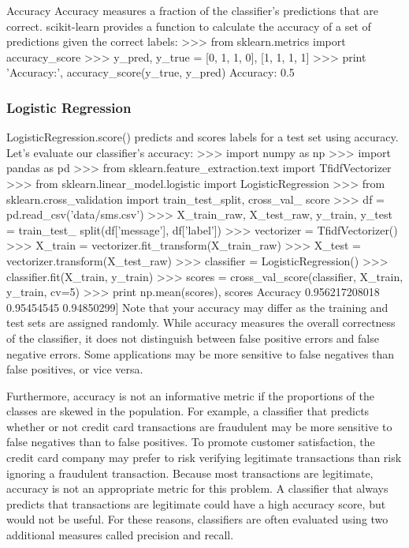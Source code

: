 \begin{frame}
\begin{frame}
\begin{frame}
\begin{frame}
\begin{frame}
Accuracy
Accuracy measures a fraction of the classifier's predictions that are correct.
scikit-learn provides a function to calculate the accuracy of a set of predictions
given the correct labels:
>>> from sklearn.metrics import accuracy_score
>>> y_pred, y_true = [0, 1, 1, 0], [1, 1, 1, 1]
>>> print 'Accuracy:', accuracy_score(y_true, y_pred)
Accuracy: 0.5
\begin{frame}\frametitle{Logistic Regression}
LogisticRegression.score() predicts and scores labels for a test set using
accuracy. Let's evaluate our classifier's accuracy:
>>> import numpy as np
>>> import pandas as pd
>>> from sklearn.feature_extraction.text import TfidfVectorizer
>>> from sklearn.linear_model.logistic import LogisticRegression
>>> from sklearn.cross_validation import train_test_split, cross_val_
score
>>> df = pd.read_csv('data/sms.csv')
>>> X_train_raw, X_test_raw, y_train, y_test = train_test_
split(df['message'], df['label'])
>>> vectorizer = TfidfVectorizer()
>>> X_train = vectorizer.fit_transform(X_train_raw)
>>> X_test = vectorizer.transform(X_test_raw)
>>> classifier = LogisticRegression()
>>> classifier.fit(X_train, y_train)
>>> scores = cross_val_score(classifier, X_train, y_train, cv=5)
>>> print np.mean(scores), scores
Accuracy 0.956217208018 %
0.95454545 0.94850299]
Note that your accuracy may differ as the training and test sets are assigned
randomly. While accuracy measures the overall correctness of the classifier, it
does not distinguish between false positive errors and false negative errors. Some
applications may be more sensitive to false negatives than false positives, or vice
versa. 
\begin{frame}
Furthermore, accuracy is not an informative metric if the proportions of
the classes are skewed in the population. For example, a classifier that predicts
whether or not credit card transactions are fraudulent may be more sensitive to
false negatives than to false positives. To promote customer satisfaction, the credit
card company may prefer to risk verifying legitimate transactions than risk ignoring
a fraudulent transaction. Because most transactions are legitimate, accuracy is
not an appropriate metric for this problem. A classifier that always predicts that
transactions are legitimate could have a high accuracy score, but would not be
useful. For these reasons, classifiers are often evaluated using two additional
measures called precision and recall.

\end{frame}
\end{frame}
\end{frame}
\end{frame}
\end{frame}
\end{frame}
\end{frame}
